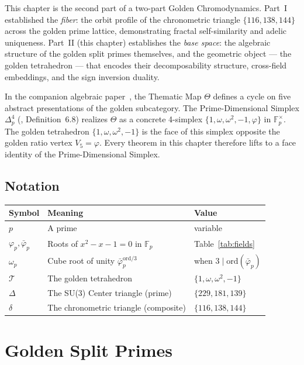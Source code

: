 \documentclass[12pt,oneside]{article}
\theoremstyle{principia}
\theoremstyle{definition}
\theoremstyle{remark}
\begin{document}
This chapter is the second part of a two-part Golden Chromodynamics.
Part~I~\cite{dwm_fst} established the \emph{fiber}: the orbit
profile of the chronometric triangle $\{116, 138, 144\}$~\cite{lockwood_chrono} across
the golden prime lattice, demonstrating fractal self-similarity
and adelic uniqueness. Part~II (this chapter) establishes the
\emph{base space}: the algebraic structure of the golden split
primes themselves, and the geometric object --- the golden
tetrahedron --- that encodes their decomposability structure,
cross-field embeddings, and the sign inversion duality.

In the companion algebraic paper~\cite{larue_lc}, the Thematic Map
$\Theta$ defines a cycle on five abstract presentations of the golden
subcategory. The Prime-Dimensional Simplex $\Delta^4_p$
(\cite{larue_lc}, Definition~6.8) realizes $\Theta$ as a concrete
4-simplex $\{1, \omega, \omega^2, -1, \varphi\}$ in $\mathbb{F}_p^\times$.
The golden tetrahedron $\{1, \omega, \omega^2, -1\}$ is the face of
this simplex opposite the golden ratio vertex $V_5 = \varphi$. Every
theorem in this chapter therefore lifts to a face identity of the
Prime-Dimensional Simplex.

\subsection{Notation}

\begin{center}
\begin{tabular}{@{}lll@{}}
\toprule
Symbol & Meaning & Value \\
\midrule
$p$ & A prime & variable \\
$\varphi_p, \bar\varphi_p$ & Roots of $x^2 - x - 1 = 0$ in $\mathbb{F}_p$ & Table~\ref{tab:fields} \\
$\omega_p$ & Cube root of unity $\bar\varphi_p^{\mathrm{ord}/3}$ & when $3 \mid \mathrm{ord}(\bar\varphi_p)$ \\
$\mathcal{T}$ & The golden tetrahedron & $\{1, \omega, \omega^2, -1\}$ \\
$\Delta$ & The SU(3) Center triangle (prime) & $\{229, 181, 139\}$ \\
$\delta$ & The chronometric triangle (composite) & $\{116, 138, 144\}$ \\
\bottomrule
\end{tabular}
\end{center}

\section{Golden Split Primes}
\label{sec:golden}
\end{document}
